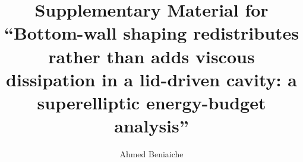 \documentclass[aip,pof,preprint]{revtex4-2}
\begin{document}
\title{Supplementary Material for ``Bottom-wall shaping redistributes rather than adds viscous dissipation in a lid-driven cavity: a superelliptic energy-budget analysis''}

\author{Ahmed Beniaiche}

\maketitle

\tableofcontents













\end{document}
